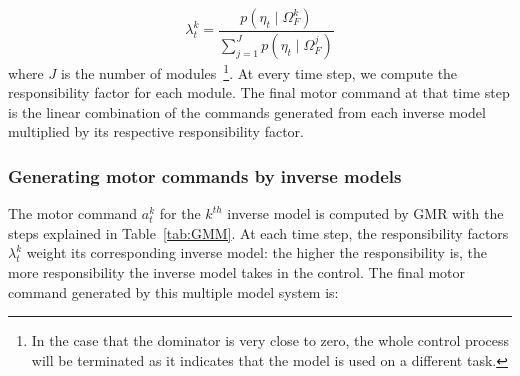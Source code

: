 \begin{equation}
\lambda^k_t = \frac{p(\eta_t {\mid} \Omega_F^k)}{\sum_{j=1}^{J}{p(\eta_t {\mid} \Omega_F^j)}}
\end{equation}
where $J$ is the number of modules~\footnote{In the case that the
  dominator is very close to zero, the whole control process will be
  terminated as it indicates that the model is used on a different
  task.}.  At every time step, we compute the responsibility factor
for each module. The final motor command at that time step is the
linear combination of the commands generated from each inverse model
multiplied by its respective responsibility factor.


\subsubsection{Generating motor commands by inverse models}
\label{sec:inverse}

The motor command $a^k_t$ for the $k^{th}$ inverse model is computed
by GMR with the steps explained in Table~\ref{tab:GMM}. At each time
step, the responsibility factors $\lambda^k_t$ weight its
corresponding inverse model: the higher the responsibility is, the
more responsibility the inverse model takes in the control. The final
motor command generated by this multiple model system is:

